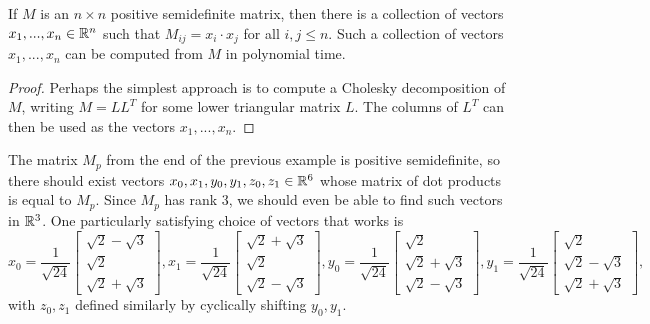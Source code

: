 \documentclass[letterpaper,11pt]{article}
\begin{document}
\begin{prop} If $M$ is an $n\times n$ positive semidefinite matrix, then there is a collection of vectors $x_1, ..., x_n \in \mathbb{R}^n$ such that $M_{ij} = x_i\cdot x_j$ for all $i,j \le n$. Such a collection of vectors $x_1, ..., x_n$ can be computed from $M$ in polynomial time.
\end{prop}
\begin{proof} Perhaps the simplest approach is to compute a Cholesky decomposition of $M$, writing $M = LL^T$ for some lower triangular matrix $L$. The columns of $L^T$ can then be used as the vectors $x_1, ..., x_n$.
\end{proof}

\begin{ex} The matrix $M_p$ from the end of the previous example is positive semidefinite, so there should exist vectors $x_0, x_1, y_0, y_1, z_0, z_1 \in \mathbb{R}^6$ whose matrix of dot products is equal to $M_p$. Since $M_p$ has rank $3$, we should even be able to find such vectors in $\mathbb{R}^3$. One particularly satisfying choice of vectors that works is
\[
x_0 = \frac{1}{\sqrt{24}}\begin{bmatrix}\sqrt{2} - \sqrt{3}\\ \sqrt{2}\\ \sqrt{2}+\sqrt{3}\end{bmatrix}, x_1 = \frac{1}{\sqrt{24}}\begin{bmatrix}\sqrt{2} + \sqrt{3}\\ \sqrt{2}\\ \sqrt{2}-\sqrt{3}\end{bmatrix}, y_0 = \frac{1}{\sqrt{24}}\begin{bmatrix}\sqrt{2}\\ \sqrt{2}+\sqrt{3}\\ \sqrt{2} - \sqrt{3}\end{bmatrix}, y_1 = \frac{1}{\sqrt{24}}\begin{bmatrix}\sqrt{2}\\ \sqrt{2}-\sqrt{3}\\ \sqrt{2} + \sqrt{3}\end{bmatrix}, 
\]
with $z_0, z_1$ defined similarly by cyclically shifting $y_0, y_1$.
\end{ex}
\end{document}
